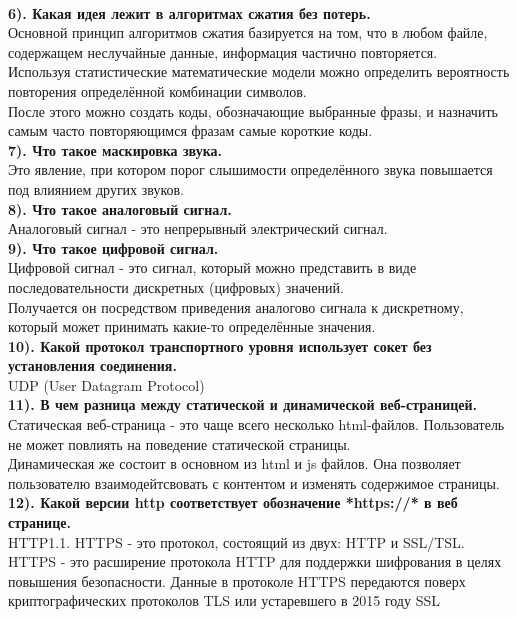 \documentclass[11pt,a4paper]{article}
\begin{document}
\\
\textbf{6). Какая идея лежит в алгоритмах сжатия без потерь.}
\\
Основной принцип алгоритмов сжатия базируется на том, что в любом файле, содержащем неслучайные данные, информация частично повторяется.
\\
Используя статистические математические модели можно определить вероятность повторения определённой комбинации символов.
\\
После этого можно создать коды, обозначающие выбранные фразы, и назначить самым часто повторяющимся фразам самые короткие коды.
\\
\textbf{7). Что такое маскировка звука.}
\\
Это явление, при котором порог слышимости определённого звука повышается под влиянием других звуков.
\\
\textbf{8). Что такое аналоговый сигнал. }
\\
Аналоговый сигнал - это непрерывный электрический сигнал.
\\
\textbf{9). Что такое цифровой сигнал.}
\\
Цифровой сигнал - это сигнал, который можно представить в виде последовательности дискретных (цифровых) значений.
\\
Получается он посредством приведения аналогово сигнала к дискретному, который может принимать какие-то определённые значения.  
\\
\textbf{10). Какой протокол транспортного уровня использует сокет без установления соединения.}
\\
UDP (User Datagram Protocol)
\\
\textbf{11). В чем разница между статической и динамической веб-страницей.}
\\
Статическая веб-страница - это чаще всего несколько html-файлов. Пользователь не может повлиять на поведение статической страницы.
\\
Динамическая же состоит в основном из html и js файлов. Она позволяет пользователю взаимодейтсвовать с контентом и изменять содержимое страницы.
\\
\textbf{12). Какой версии http соответствует обозначение *https://* в веб странице.}
\\
HTTP1.1. HTTPS - это протокол, состоящий из двух: HTTP и SSL/TSL.
\\
HTTPS - это расширение протокола HTTP для поддержки шифрования в целях повышения безопасности. Данные в протоколе HTTPS передаются поверх криптографических протоколов TLS или устаревшего в 2015 году SSL
\end{document}
